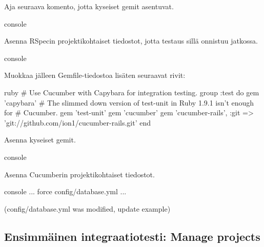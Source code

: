 \documentclass{article}
\newcommand{\pdfforeignlanguage}[2]{\texorpdfstring{\foreignlanguage{#1}{#2}}{#2}}
\newcommand{\eng}[1]{\pdfforeignlanguage{english}{#1}}
\begin{document}
\begin{samepage}
Aja seuraava komento, jotta kyseiset gemit asentuvat.

\begin{pygmented}{console}
\end{pygmented}
\end{samepage}

\begin{samepage}
Asenna RSpecin projektikohtaiset tiedostot, jotta testaus sillä onnistuu
jatkossa.

\begin{pygmented}{console}
\end{pygmented}
\end{samepage}

\begin{samepage}
Muokkaa jälleen Gemfile-tiedostoa lisäten seuraavat rivit:

\begin{pygmented}{ruby}
# Use Cucumber with Capybara for integration testing.
group :test do
  gem 'capybara'
  # The slimmed down version of test-unit in Ruby 1.9.1 isn't enough for
  # Cucumber.
  gem 'test-unit'
  gem 'cucumber'
  gem 'cucumber-rails', :git => 'git://github.com/ion1/cucumber-rails.git'
end
\end{pygmented}
\end{samepage}

\begin{samepage}
Asenna kyseiset gemit.

\begin{pygmented}{console}
\end{pygmented}
\end{samepage}

\begin{samepage}
Asenna Cucumberin projektikohtaiset tiedostot.

\begin{pygmented}{console}
...
       force  config/database.yml
...

(config/database.yml was modified, update example)

\end{pygmented}
\end{samepage}

\subsection{Ensimmäinen integraatiotesti: \eng{Manage projects}}
\end{document}
